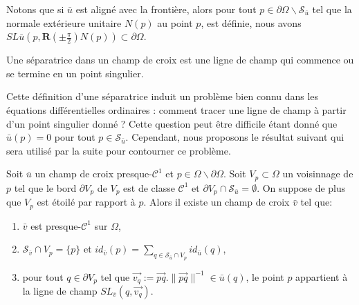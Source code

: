 \begin{remark}
Notons que si $\bar{u}$ est aligné avec la frontière, alors pour tout $p\in \partial \Omega \backslash \mathcal{S}_{\bar{u}}$ tel que la normale extérieure unitaire $N(p)$ au point $p$, est définie, nous avons $SL{\bar{u}}\left(p,\mathbf{R}\left(\pm \frac{\pi}{2}\right)N(p)\right) \subset \partial \Omega$.
\end{remark}

\begin{definition}[Séparatrice] \label{def:sep}
Une séparatrice dans un champ de croix est une ligne de champ qui commence ou se termine en un point singulier.
\end{definition}

Cette définition d'une séparatrice induit un problème bien connu dans les équations différentielles ordinaires : comment tracer une ligne de champ à partir d'un point singulier donné ? Cette question peut être difficile étant donné que $\bar{u}(p)={0}$ pour tout $p\in \mathcal{S}_{\bar{u}}$. Cependant, nous proposons le résultat suivant qui sera utilisé par la suite pour contourner ce problème.
\begin{proposition}
\label{prop:stream_from_interior_sing}
Soit $\bar{u}$ un champ de croix presque-$\mathcal{C}^1$ et $p\in \Omega\backslash\partial\Omega$. Soit $V_p\subset\Omega$ un voisinnage de $p$ tel que le bord $\partial V_p$ de $V_p$ est de classe $\mathcal{C}^1$ et $\partial V_p\cap\mathcal{S}_{\bar{u}}=\emptyset$. On suppose de plus que $V_p$ est étoilé par rapport à $p$. Alors il existe un champ de croix $\bar{v}$ tel que:\\[-0.3cm]
\begin{enumerate}
\item $\bar{v}$ est presque-$\mathcal{C}^1$ sur $\Omega$,\\[-0.3cm]
\item $\mathcal{S}_{\bar{v}}\cap V_p =\{p\}$ et $id_{\bar{v}}(p)=\sum_{q\in \mathcal{S}_{\bar{u}}\cap V_p} id_{\bar{u}}(q)$,\\[-0.3cm]
\item pour tout $q\in \partial V_p$ tel que $\overrightarrow{v_q}:=\overrightarrow{pq}.\|\overrightarrow{pq}\|^{-1}\in \bar{u}(q)$, le point $p$ appartient à la ligne de champ $SL_{\bar{v}}(q,\overrightarrow{v_q})$.\\[-0.3cm]
\end{enumerate}
\end{proposition}


